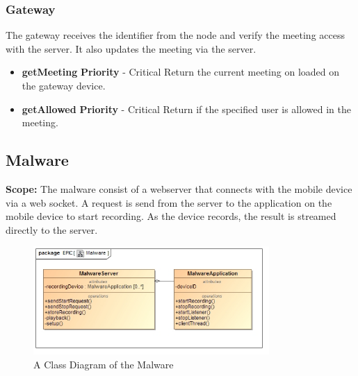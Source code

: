 \documentclass[a4paper,12pt,titlepage]{article}
\begin{document}
		\subsubsection{Gateway} The gateway receives the identifier from the node and verify the meeting access with the server. It also updates the meeting via the server.
		\begin{itemize}
			\item \textbf{getMeeting}
				\newline\textbf{ Priority } - Critical
				\newline Return the current meeting on loaded on the gateway device.
			\item \textbf{getAllowed}
				\newline\textbf{ Priority } - Critical
				\newline Return if the specified user is allowed in the meeting.
			

		\end{itemize}



\newpage
		
		\subsection{Malware}
		\textbf{Scope: } The malware consist of a webserver that connects with the mobile device via a web socket. A request is send from the server to the application on the mobile device to start recording. As the device records, the result is streamed directly to the server.
		\begin{figure}[h!]
 			 \centering
			  \includegraphics[width=0.8\textwidth]{MalwareClass}
		 	 \caption{A Class Diagram of the Malware}
		\end{figure}
\end{document}

